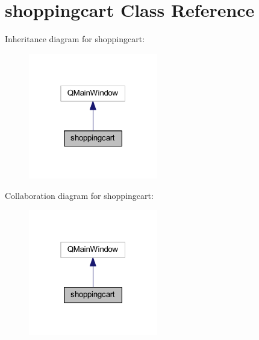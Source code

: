 \hypertarget{classshoppingcart}{}\section{shoppingcart Class Reference}
\label{classshoppingcart}


Inheritance diagram for shoppingcart\+:\nopagebreak
\begin{figure}[H]
\begin{center}
\leavevmode
\includegraphics[width=160pt]{classshoppingcart__inherit__graph}
\end{center}
\end{figure}


Collaboration diagram for shoppingcart\+:\nopagebreak
\begin{figure}[H]
\begin{center}
\leavevmode
\includegraphics[width=160pt]{classshoppingcart__coll__graph}
\end{center}
\end{figure}
